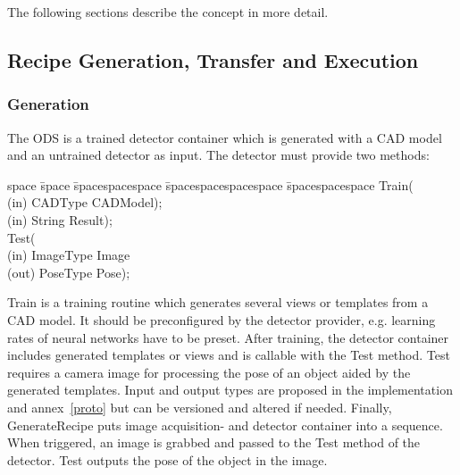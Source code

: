 The following sections describe the concept in more detail.

\subsection{Recipe Generation, Transfer and Execution}
\subsubsection{Generation}
    The ODS is a trained detector container which is generated with a CAD model and an untrained detector as input. The detector must provide two methods:
\begin{minipage}{\linewidth}
\begin{tabbing}
    space \= space \= spacespacespace \= spacespacespacespace \= spacespacespace \kill
    \>  Train(\\
    \>  \>  (in)	 \> 	CADType          \> CADModel); \\
    \>  \>  (in)	 \> 	String          \> Result); \\
    \>  Test(\\
    \>  \>  (in)	 \> 	ImageType     \> Image\\
    \>  \>  (out)	 \> 	PoseType           \> Pose); 
\end{tabbing}\label{detectormethods}
\end{minipage}

Train is a training routine which generates several views or templates from a CAD model. It should be preconfigured by the detector provider, e.g. learning rates of neural networks have to be preset. After training, the detector container includes generated templates or views and is callable with the Test method.  Test requires a camera image for processing the pose of an object aided by the generated templates.  Input and output types are proposed in the implementation and annex~\ref{proto} but can be versioned and altered if needed. Finally, GenerateRecipe puts image acquisition- and detector container into a sequence. When triggered, an image is grabbed and passed to the Test method of the detector. Test outputs the pose of the object in the image.

